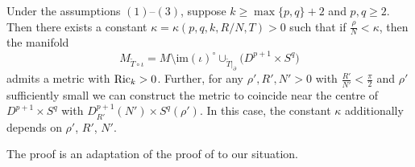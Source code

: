 \begin{Theorem}\label{surgery}
	Under the assumptions $(1)$--$(3)$, suppose $k\geq\max\{p,q \}+2$ and $p,q\geq2$. Then there exists a constant $\kappa=\kappa(p,q,k,R/N,T)>0$ such that if $\frac{\rho}{N}<\kappa$, then the manifold
	\[M_{\tilde{T}\circ\iota}=M\setminus\mathrm{im}(\iota)^\circ\cup_{\tilde{T}|_\partial} \bigl(D^{p+1}\times S^q\bigr) \]
	admits a metric with ${\rm Ric}_k>0$. Further, for any $\rho',R',N'>0$ with $\frac{R'}{N'}<\frac{\pi}{2}$ and $\rho'$ sufficiently small we can construct the metric to coincide near the centre of $D^{p+1}\times S^q$ with $D^{p+1}_{R'}(N')\times S^q(\rho')$. In this case, the constant $\kappa$ additionally depends on $\rho'$, $R'$, $N'$.
\end{Theorem}
The proof is an adaptation of the proof of \cite[Theorem 0.3]{Wr2} to our situation.
